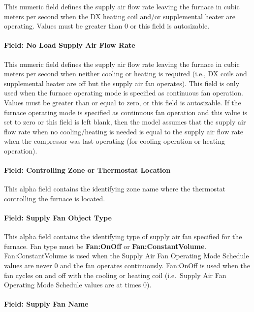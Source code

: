 This numeric field defines the supply air flow rate leaving the furnace in cubic meters per second when the DX heating coil and/or supplemental heater are operating. Values must be greater than 0 or this field is autosizable.

\paragraph{Field: No Load Supply Air Flow Rate}\label{field-no-load-supply-air-flow-rate-1-000}

This numeric field defines the supply air flow rate leaving the furnace in cubic meters per second when neither cooling or heating is required (i.e., DX coils and supplemental heater are off but the supply air fan operates). This field is only used when the furnace operating mode is specified as continuous fan operation. Values must be greater than or equal to zero, or this field is autosizable. If the furnace operating mode is specified as continuous fan operation and this value is set to zero or this field is left blank, then the model assumes that the supply air flow rate when no cooling/heating is needed is equal to the supply air flow rate when the compressor was last operating (for cooling operation or heating operation).

\paragraph{Field: Controlling Zone or Thermostat Location}\label{field-controlling-zone-or-thermostat-location-1}

This alpha field contains the identifying zone name where the thermostat controlling the furnace is located.

\paragraph{Field: Supply Fan Object Type}\label{field-supply-fan-object-type-1}

This alpha field contains the identifying type of supply air fan specified for the furnace. Fan type must be \textbf{Fan:OnOff} or \textbf{Fan:ConstantVolume}. Fan:ConstantVolume is used when the Supply Air Fan Operating Mode Schedule values are never 0 and the fan operates continuously. Fan:OnOff is used when the fan cycles on and off with the cooling or heating coil (i.e.~Supply Air Fan Operating Mode Schedule values are at times 0).

\paragraph{Field: Supply Fan Name}\label{field-supply-fan-name-1}

